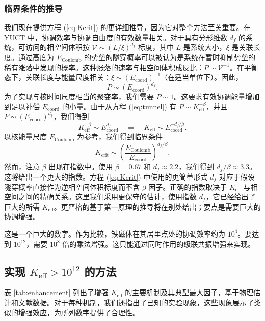 \documentclass[12pt]{article}
\theoremstyle{remark}
\newcommand{\Keff}{K_{\mathrm{eff}}}
\newcommand{\df}{d_{\!f}}
\newcommand{\Kcrit}{K_{\mathrm{crit}}}
\begin{document}
	\subsubsection{临界条件的推导}
	
	我们现在提供方程 (\ref{eq:Kcrit}) 的更详细推导，因为它对整个方法至关重要。在 YUCT 中，协调效率与协调自由度的有效数量相关。对于具有分形维数 \(\df\) 的系统，可访问的相空间体积按 \(\mathcal{V} \sim (L/\xi)^{\df}\) 标度，其中 \(L\) 是系统大小，\(\xi\) 是关联长度。通过高度为 \(E_{\text{Coulomb}}\) 的势垒的隧穿概率可以被认为是系统在暂时抑制势垒的稀有涨落中发现的概率。这种涨落的速率与相空间体积成反比：\(P \sim \mathcal{V}^{-1}\)。在平衡态下，关联长度与能量尺度相关：\(\xi \sim (E_{\mathrm{coord}})^{-1}\)（在适当单位下）。因此，
	\[
	P \sim (E_{\mathrm{coord}})^{\df}.
	\]
	为了实现与核时间尺度相当的聚变率，我们需要 \(P \sim 1\)。这要求有效协调能量增加到足以补偿 \(E_{\mathrm{coord}}\) 的小量。由于从方程 (\ref{eq:tunnel}) 有 \(P \sim \Keff^{-\beta}\)，并且 \(P \sim (E_{\mathrm{coord}})^{\df}\)，我们得到
	\[
	\Keff^{-\beta} \sim E_{\mathrm{coord}}^{\df} \quad\Longrightarrow\quad \Keff \sim E_{\mathrm{coord}}^{-\df/\beta}.
	\]
	以核能量尺度 \(E_{\text{Coulomb}}\) 为参考，我们得到临界条件
	\[
	\Kcrit \sim \left( \frac{E_{\text{Coulomb}}}{E_{\mathrm{coord}}} \right)^{\df/\beta}.
	\]
	然而，注意 \(\beta\) 出现在指数中。使用 \(\beta = 0.67\) 和 \(\df \approx 2.2\)，我们得到 \(\df/\beta \approx 3.3\)。这将给出一个更大的指数。方程 (\ref{eq:Kcrit}) 中使用的更简单形式 \(\df\) 对应于假设隧穿概率直接作为逆相空间体积标度而不含 \(\beta\) 因子。正确的指数取决于 \(\Keff\) 与相空间之间的精确关系。这里我们采用更保守的估计，使用指数 \(\df\)，它已经给出了巨大的所需 \(\Keff\)。更严格的基于第一原理的推导将在别处给出；要点是需要巨大的协调增强。
	
	这是一个巨大的数字。作为比较，铁磁体在其居里点处的协调效率约为 \(10^4\)。要达到 \(10^{12}\)，需要 \(10^8\) 倍的乘法增强。这只能通过同时作用的级联共振增强来实现。
	
	\subsection{实现 \(\Keff > 10^{12}\) 的方法}
	
	表 \ref{tab:enhancement} 列出了增强 \(\Keff\) 的主要机制及其典型最大因子，基于物理估计和文献数据。对于每种机制，我们还指出了已知的实验现象，这些现象展示了类似的增强效应，为所列数字提供了合理性。
	
\end{document}
